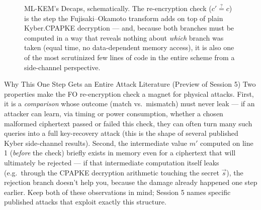 \begin{figure}[h]
\centering
{}
\caption{ML-KEM's Decaps, schematically. The re-encryption check ($c' \overset{?}{=} c$) is the step the Fujisaki--Okamoto transform adds on top of plain Kyber.CPAPKE decryption --- and, because both branches must be computed in a way that reveals nothing about \emph{which} branch was taken (equal time, no data-dependent memory access), it is also one of the most scrutinized few lines of code in the entire scheme from a side-channel perspective.}
\label{fig:fo-transform}
\end{figure}

\begin{previewbox}{Why This One Step Gets an Entire Attack Literature (Preview of Session 5)}
Two properties make the FO re-encryption check a magnet for physical attacks. First, it is a \emph{comparison} whose outcome (match vs.\ mismatch) must never leak --- if an attacker can learn, via timing or power consumption, whether a chosen malformed ciphertext passed or failed this check, they can often turn many such queries into a full key-recovery attack (this is the shape of several published Kyber side-channel results). Second, the intermediate value $m'$ computed on line 1 (\emph{before} the check) briefly exists in memory even for a ciphertext that will ultimately be rejected --- if that intermediate computation itself leaks (e.g.\ through the CPAPKE decryption arithmetic touching the secret $\vec s$), the rejection branch doesn't help you, because the damage already happened one step earlier. Keep both of these observations in mind; Session 5 names specific published attacks that exploit exactly this structure.
\end{previewbox}

